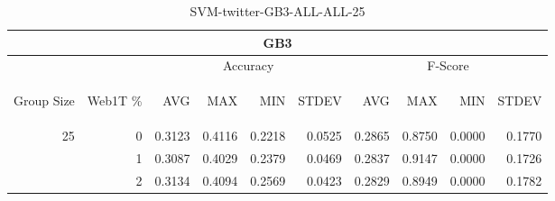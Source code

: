 \begin{center}
\begin{table}[htbp] 
 \begin{center}
\begin{tabular}{ | r | r | r | r | r | r | r | r | r | r |}
\hline
\multicolumn{10}{|c|}{GB3}\\
\hline
 & & \multicolumn{4}{|c|}{Accuracy} & \multicolumn{4}{|c|}{F-Score}\\ \cline{3-10}
\begin{sideways}Group Size\end{sideways} & \begin{sideways}Web1T \%\end{sideways} & \begin{sideways}AVG\end{sideways} & \begin{sideways}MAX\end{sideways} & \begin{sideways}MIN\end{sideways} & \begin{sideways}STDEV\end{sideways} & \begin{sideways}AVG\end{sideways} & \begin{sideways}MAX\end{sideways} & \begin{sideways}MIN\end{sideways} & \begin{sideways}STDEV\end{sideways}\\
\hline
\multirow{2}{*}{25}
 & 0 & 0.3123 & 0.4116 & 0.2218 & 0.0525 & 0.2865 & 0.8750 & 0.0000 & 0.1770\\ \cline{2-10}
 & 1 & 0.3087 & 0.4029 & 0.2379 & 0.0469 & 0.2837 & 0.9147 & 0.0000 & 0.1726\\ \cline{2-10}
 & 2 & 0.3134 & 0.4094 & 0.2569 & 0.0423 & 0.2829 & 0.8949 & 0.0000 & 0.1782\\ \cline{2-10}
\hline
\end{tabular}
\caption{SVM-twitter-GB3-ALL-ALL-25}
\label{table:SVM-twitter-GB3-ALL-ALL-25}
\end{center}
 \end{table}
\end{center}

